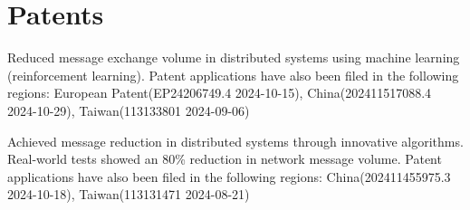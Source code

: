 \section{Patents}
\begin{resumeitems}
  \item Reduced message exchange volume in distributed systems using machine learning (reinforcement learning). Patent applications have also been filed in the following regions: European Patent(EP24206749.4 2024-10-15), China(202411517088.4 2024-10-29), Taiwan(113133801 2024-09-06)
\end{resumeitems}
\begin{resumeitems}
  \item Achieved message reduction in distributed systems through innovative algorithms. Real-world tests showed an 80\% reduction in network message volume. Patent applications have also been filed in the following regions: China(202411455975.3 2024-10-18), Taiwan(113131471 2024-08-21)
\end{resumeitems}
